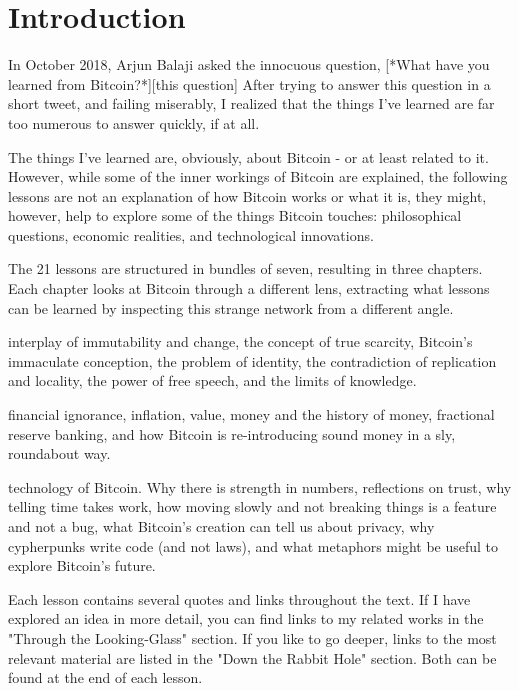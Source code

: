 \chapter{Introduction}
\label{ch:introduction}

In October 2018, Arjun Balaji asked the innocuous question, [*What have you
learned from Bitcoin?*][this question] After trying to answer this question in a
short tweet, and failing miserably, I realized that the things I've learned are
far too numerous to answer quickly, if at all.

The things I've learned are, obviously, about Bitcoin - or at least related to
it. However, while some of the inner workings of Bitcoin are explained, the
following lessons are not an explanation of how Bitcoin works or what it is,
they might, however, help to explore some of the things Bitcoin touches:
philosophical questions, economic realities, and technological innovations.

The 21 lessons are structured in bundles of seven, resulting in three chapters.
Each chapter looks at Bitcoin through a different lens, extracting what
lessons can be learned by inspecting this strange network from a different
angle.

interplay of immutability and change, the concept of true scarcity, Bitcoin's
immaculate conception, the problem of identity, the contradiction of replication
and locality, the power of free speech, and the limits of knowledge.

financial ignorance, inflation, value, money and the history of money,
fractional reserve banking, and how Bitcoin is re-introducing sound money in a
sly, roundabout way.

technology of Bitcoin.  Why there is strength in numbers, reflections on trust,
why telling time takes work, how moving slowly and not breaking things is a
feature and not a bug, what Bitcoin's creation can tell us about privacy, why
cypherpunks write code (and not laws), and what metaphors might be useful to
explore Bitcoin's future.

Each lesson contains several quotes and links throughout the text. If I have
explored an idea in more detail, you can find links to my related works in the
"Through the Looking-Glass" section. If you like to go deeper, links to the most
relevant material are listed in the "Down the Rabbit Hole" section. Both can be
found at the end of each lesson.

